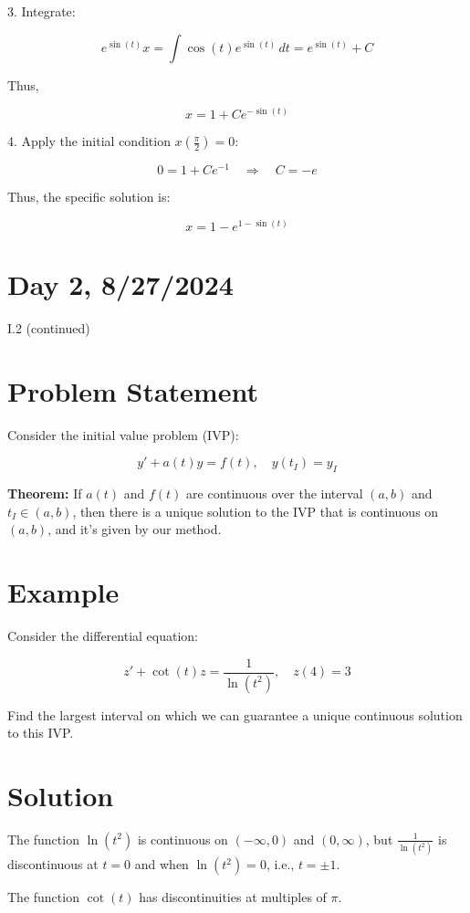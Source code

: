 \documentclass{article}
\begin{document}
3. Integrate:

\[
e^{\sin(t)} x = \int \cos(t) e^{\sin(t)} \, dt = e^{\sin(t)} + C
\]

Thus,

\[
x = 1 + C e^{-\sin(t)}
\]

4. Apply the initial condition \( x\left(\frac{\pi}{2}\right) = 0 \):

\[
0 = 1 + C e^{-1} \quad \Rightarrow \quad C = -e
\]

Thus, the specific solution is:

\[
x = 1 - e^{1 - \sin(t)}
\]

\section*{Day 2, 8/27/2024}

I.2 (continued)

\section*{Problem Statement}

Consider the initial value problem (IVP):

\[
y' + a(t)y = f(t), \quad y(t_I) = y_I
\]

\textbf{Theorem:}  
If \( a(t) \) and \( f(t) \) are continuous over the interval \( (a, b) \) and \( t_I \in (a, b) \), then there is a unique solution to the IVP that is continuous on \( (a, b) \), and it's given by our method.

\section*{Example}

Consider the differential equation:

\[
z' + \cot(t)z = \frac{1}{\ln(t^2)}, \quad z(4) = 3
\]

Find the largest interval on which we can guarantee a unique continuous solution to this IVP.

\section*{Solution}

The function \( \ln(t^2) \) is continuous on \( (-\infty, 0) \) and \( (0, \infty) \), but \( \frac{1}{\ln(t^2)} \) is discontinuous at \( t = 0 \) and when \( \ln(t^2) = 0 \), i.e., \( t = \pm 1 \).

The function \( \cot(t) \) has discontinuities at multiples of \( \pi \).
\end{document}
